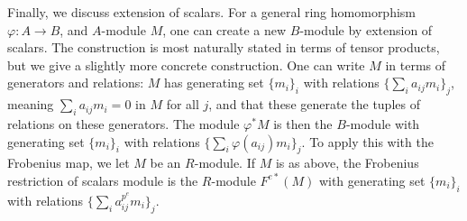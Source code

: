 \documentclass[12pt]{amsart}
\theoremstyle{definition}
\numberwithin{equation}{theorem}
\def\phi{\varphi}
\def\to{\longrightarrow}
\begin{document}
Finally, we discuss extension of scalars.  For a general ring homomorphism ${\phi:A\to B}$, and $A$-module $M$, one can create a new $B$-module by extension of scalars. The construction is most naturally stated in terms of tensor products, but we give a slightly more concrete construction. One can write $M$ in terms of generators and relations: $M$ has generating set $\{m_i\}_i$ with relations $\{ \sum_i a_{ij} m_i\}_j$, meaning $\sum_i a_{ij} m_i = 0$ in $M$ for all $j$, and that these generate the tuples of relations on these generators.  The module $\phi^*M$ is then the $B$-module with generating set $\{m_i\}_i$ with relations $\{ \sum_i \phi(a_{ij}) m_i\}_j$. To apply this with the Frobenius map, we let $M$ be an $R$-module. If $M$ is as above, the Frobenius restriction of scalars module is the $R$-module $F^{e*}(M)$ with generating set $\{m_i\}_i$ with relations $\{ \sum_i a_{ij}^{p^e} m_i\}_j$.
\end{document}
